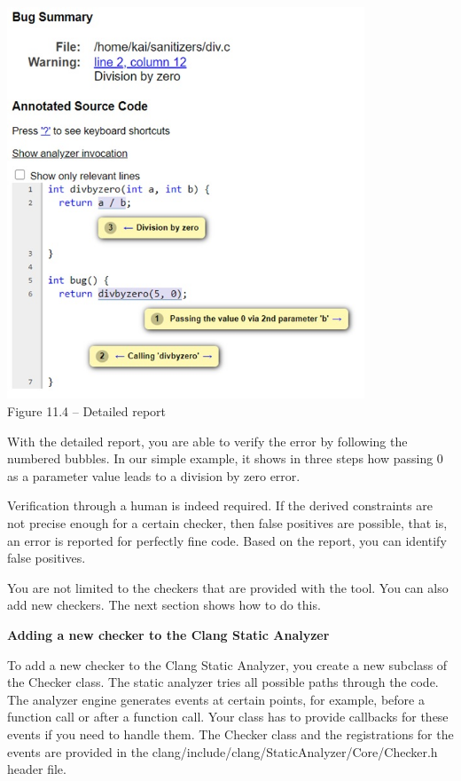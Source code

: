 \hspace*{\fill} \par %
\begin{center}
\includegraphics[width=0.8\textwidth]{content/3/chapter11/images/4.jpg}\\
Figure 11.4 – Detailed report
\end{center}

With the detailed report, you are able to verify the error by following the numbered bubbles. In our simple example, it shows in three steps how passing 0 as a parameter value leads to a division by zero error.\par
 
Verification through a human is indeed required. If the derived constraints are not precise enough for a certain checker, then false positives are possible, that is, an error is reported for perfectly fine code. Based on the report, you can identify false positives.\par

You are not limited to the checkers that are provided with the tool. You can also add new checkers. The next section shows how to do this.\par


\hspace*{\fill} \par %
\textbf{Adding a new checker to the Clang Static Analyzer}

To add a new checker to the Clang Static Analyzer, you create a new subclass of the Checker class. The static analyzer tries all possible paths through the code. The analyzer engine generates events at certain points, for example, before a function call or after a function call. Your class has to provide callbacks for these events if you need to handle them. The Checker class and the registrations for the events are provided in the clang/include/clang/StaticAnalyzer/Core/Checker.h header file.\par

